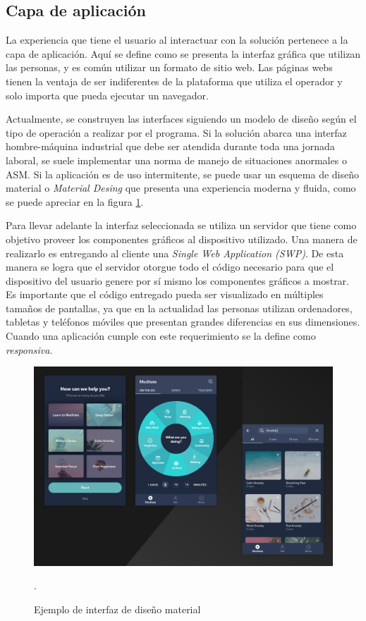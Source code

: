 \subsection{Capa de aplicación}
La experiencia que tiene el usuario al interactuar con la solución pertenece a la capa de aplicación.
Aquí se define como se presenta la interfaz gráfica que utilizan las personas, y es común utilizar un formato de sitio web.
Las páginas webs tienen la ventaja de ser indiferentes de la plataforma que utiliza el operador y solo importa que pueda ejecutar un navegador.

Actualmente, se construyen las interfaces siguiendo un modelo de diseño según el tipo de operación a realizar por el programa.
Si la solución abarca una interfaz hombre-máquina industrial que debe ser atendida durante toda una jornada laboral, se suele implementar una norma de manejo de situaciones anormales o ASM.
Si la aplicación es de uso intermitente, se puede usar un esquema de diseño material o \emph{Material Desing} que presenta una experiencia moderna y fluida, como se puede apreciar en la figura \ref{fig:ch1MaterialDesign}.

Para llevar adelante la interfaz seleccionada se utiliza un servidor que tiene como objetivo proveer los componentes gráficos al dispositivo utilizado.
Una manera de realizarlo es entregando al cliente una \emph{Single Web Application (SWP)}.
De esta manera se logra que el servidor otorgue todo el código necesario para que el dispositivo del usuario genere por sí mismo los componentes gráficos a mostrar.
Es importante que el código entregado pueda ser visualizado en múltiples tamaños de pantallas, ya que en la actualidad las personas utilizan ordenadores, tabletas y teléfonos móviles que presentan grandes diferencias en sus dimensiones.
Cuando una aplicación cumple con este requerimiento se la define como \emph{responsiva}.

\begin{figure}[h]
	\centering
	\includegraphics[width=\textwidth]{./Figures/ch1MaterialDesign.jpg}
	\caption{Ejemplo de interfaz de diseño material \citep{WEBSITE:Material}}.
	\label{fig:ch1MaterialDesign}
\end{figure}

